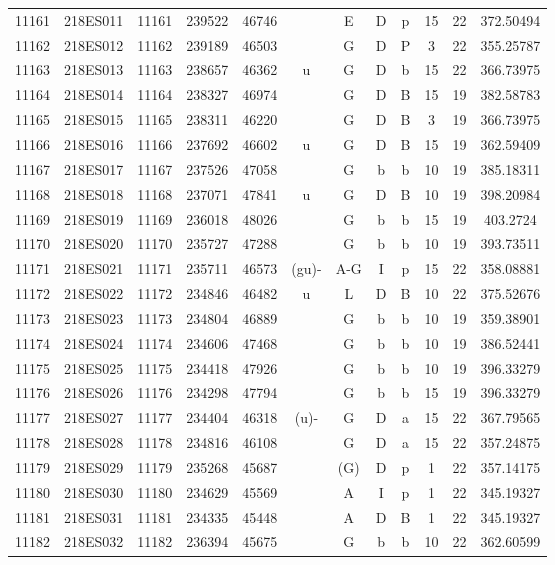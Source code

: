 \begin{tabular}{|*{12}{c|}}
11161 & 218ES011 & 11161 & 239522 & 46746 &  & E & D & p & 15 & 22 & 372.50494 \\ 
11162 & 218ES012 & 11162 & 239189 & 46503 &  & G & D & P & 3 & 22 & 355.25787 \\ 
11163 & 218ES013 & 11163 & 238657 & 46362 & u & G & D & b & 15 & 22 & 366.73975 \\ 
11164 & 218ES014 & 11164 & 238327 & 46974 &  & G & D & B & 15 & 19 & 382.58783 \\ 
11165 & 218ES015 & 11165 & 238311 & 46220 &  & G & D & B & 3 & 19 & 366.73975 \\ 
11166 & 218ES016 & 11166 & 237692 & 46602 & u & G & D & B & 15 & 19 & 362.59409 \\ 
11167 & 218ES017 & 11167 & 237526 & 47058 &  & G & b & b & 10 & 19 & 385.18311 \\ 
11168 & 218ES018 & 11168 & 237071 & 47841 & u & G & D & B & 10 & 19 & 398.20984 \\ 
11169 & 218ES019 & 11169 & 236018 & 48026 &  & G & b & b & 15 & 19 & 403.2724 \\ 
11170 & 218ES020 & 11170 & 235727 & 47288 &  & G & b & b & 10 & 19 & 393.73511 \\ 
11171 & 218ES021 & 11171 & 235711 & 46573 & (gu)- & A-G & I & p & 15 & 22 & 358.08881 \\ 
11172 & 218ES022 & 11172 & 234846 & 46482 & u & L & D & B & 10 & 22 & 375.52676 \\ 
11173 & 218ES023 & 11173 & 234804 & 46889 &  & G & b & b & 10 & 19 & 359.38901 \\ 
11174 & 218ES024 & 11174 & 234606 & 47468 &  & G & b & b & 10 & 19 & 386.52441 \\ 
11175 & 218ES025 & 11175 & 234418 & 47926 &  & G & b & b & 10 & 19 & 396.33279 \\ 
11176 & 218ES026 & 11176 & 234298 & 47794 &  & G & b & b & 15 & 19 & 396.33279 \\ 
11177 & 218ES027 & 11177 & 234404 & 46318 & (u)- & G & D & a & 15 & 22 & 367.79565 \\ 
11178 & 218ES028 & 11178 & 234816 & 46108 &  & G & D & a & 15 & 22 & 357.24875 \\ 
11179 & 218ES029 & 11179 & 235268 & 45687 &  & (G) & D & p & 1 & 22 & 357.14175 \\ 
11180 & 218ES030 & 11180 & 234629 & 45569 &  & A & I & p & 1 & 22 & 345.19327 \\ 
11181 & 218ES031 & 11181 & 234335 & 45448 &  & A & D & B & 1 & 22 & 345.19327 \\ 
11182 & 218ES032 & 11182 & 236394 & 45675 &  & G & b & b & 10 & 22 & 362.60599 \\ 

\end{tabular}
